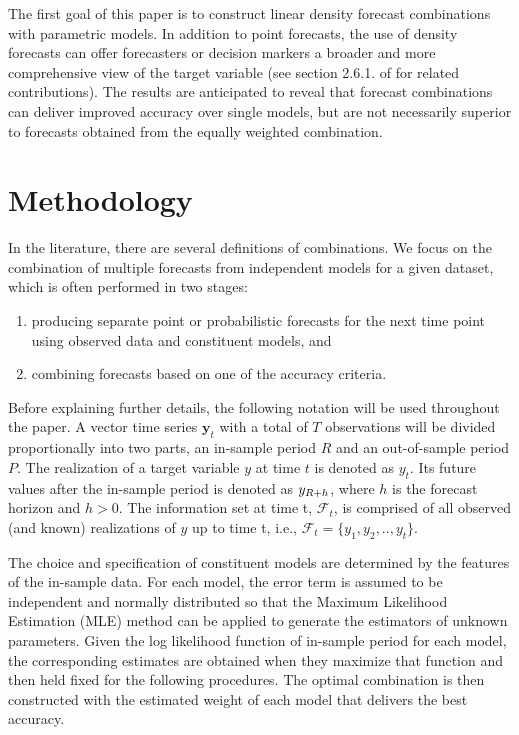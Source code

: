 \documentclass{monashthesis}
\begin{document}
The first goal of this paper is to construct linear density forecast combinations with parametric models. In addition to point forecasts, the use of density forecasts can offer forecasters or decision markers a broader and more comprehensive view of the target variable (see section 2.6.1. of \textcite{FTP22} for related contributions). The results are anticipated to reveal that forecast combinations can deliver improved accuracy over single models, but are not necessarily superior to forecasts obtained from the equally weighted combination.

\hypertarget{method}{%
\chapter{Methodology}\label{method}}

In the literature, there are several definitions of combinations. We focus on the combination of multiple forecasts from independent models for a given dataset, which is often performed in two stages:

\begin{enumerate}
\def\labelenumi{\arabic{enumi}.}
\item
  producing separate point or probabilistic forecasts for the next time point using observed data and constituent models, and
\item
  combining forecasts based on one of the accuracy criteria.
\end{enumerate}

Before explaining further details, the following notation will be used throughout the paper. A vector time series \(\textbf{y}_t\) with a total of \(T\) observations will be divided proportionally into two parts, an in-sample period \(R\) and an out-of-sample period \(P\). The realization of a target variable \(y\) at time \(t\) is denoted as \(y_{t}\). Its future values after the in-sample period is denoted as \(y_{\small{R+h}}\), where \(h\) is the forecast horizon and \(h>0\). The information set at time t, \(\mathcal{F}_t\), is comprised of all observed (and known) realizations of \(y\) up to time t, i.e., \(\mathcal{F}_t = \{y_1, y_2, .., y_t\}\).

The choice and specification of constituent models are determined by the features of the in-sample data. For each model, the error term is assumed to be independent and normally distributed so that the Maximum Likelihood Estimation (MLE) method can be applied to generate the estimators of unknown parameters. Given the log likelihood function of in-sample period for each model, the corresponding estimates are obtained when they maximize that function and then held fixed for the following procedures. The optimal combination is then constructed with the estimated weight of each model that delivers the best accuracy.
\end{document}
